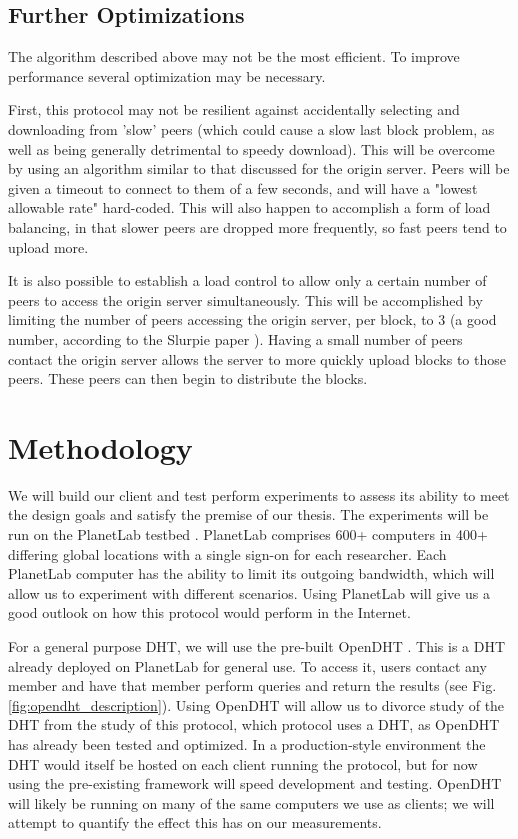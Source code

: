 \subsection{Further Optimizations}
The algorithm described above may not be the most efficient.  To improve performance several optimization may be necessary.

First, this protocol may  not be resilient against accidentally selecting and downloading from 'slow' peers (which could cause a slow last block problem, as well as being generally detrimental to speedy download).  This will be overcome by using an algorithm similar to that discussed for the origin server.  Peers will be given a timeout to connect to them of a few seconds, and will have a "lowest allowable rate" hard-coded. This will also happen to accomplish a form of load balancing, in that slower peers are dropped more frequently, so fast peers tend to upload more. %

It is also possible to establish a load control to allow only a certain number of peers to access the origin server simultaneously.  This will be accomplished by limiting the number of peers accessing the origin server, per block, to 3 (a good number, according to the Slurpie paper \cite{slurpie}).  Having a small number of peers contact the origin server allows the server to more quickly upload blocks to those peers.  These peers can then begin to distribute the blocks.  

\section{Methodology}

We will build our client and test perform experiments to assess its ability to meet the design goals and satisfy the premise of our thesis.  The experiments will be run on the PlanetLab testbed \cite{planetlab}.  PlanetLab comprises 600+ computers in 400+ differing global locations with a single sign-on for each researcher. Each PlanetLab computer has the ability to limit its outgoing bandwidth, which will allow us to experiment with different scenarios.  Using PlanetLab will give us a good outlook on how this protocol would perform in the Internet.

For a general purpose DHT, we will use the pre-built OpenDHT \cite{openDHT}.  This is a DHT already deployed on PlanetLab for general use.  To access it, users contact any member and have that member perform queries and return the results (see Fig. \ref{fig:opendht_description}).  Using OpenDHT will allow us to divorce study of the DHT from the study of this protocol, which protocol uses a DHT, as OpenDHT has already been tested and optimized.  In a production-style environment the DHT would itself be hosted on each client running the protocol, but for now using the pre-existing framework will speed development and testing.  OpenDHT will likely be running on many of the same computers we use as clients; we will attempt to quantify the effect this has on our measurements.  

